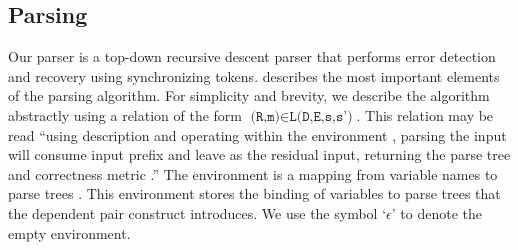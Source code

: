 



\subsection{Parsing}
\label{sec:parse}
Our parser is a top-down recursive descent parser
that performs error detection and recovery using synchronizing tokens.
 describes the most important elements
of the parsing algorithm.  For simplicity and brevity, we
describe the algorithm abstractly
using a relation of the form 
${\texttt{(R,m)} \in \texttt{L(D,E,s,s')}}$.  This relation may be
read ``using description  and operating within the environment ,
parsing the input  will consume input prefix  and leave  as the residual input, 
returning the parse tree  and correctness metric .''   
The environment  is a mapping from variable names
 to parse trees .  This environment stores the
binding of variables to parse trees that the \pads{} dependent
pair construct introduces.   We use the symbol `$\epsilon$' to denote the empty environment.

